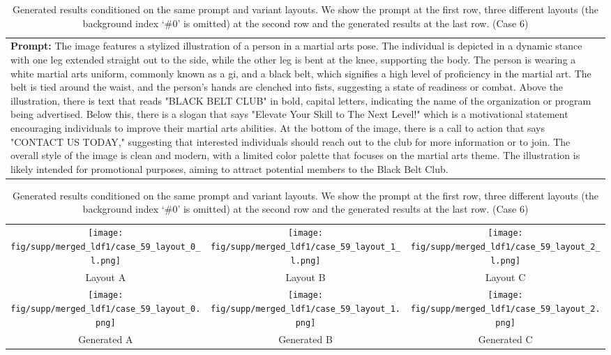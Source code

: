 \begin{table}[htbp]
    \centering
    \begin{tabular}{p{\textwidth}}
    \midrule
    \textbf{Prompt:} \small{The image features a stylized illustration of a person in a martial arts pose. The individual is depicted in a dynamic stance with one leg extended straight out to the side, while the other leg is bent at the knee, supporting the body. The person is wearing a white martial arts uniform, commonly known as a gi, and a black belt, which signifies a high level of proficiency in the martial art. The belt is tied around the waist, and the person's hands are clenched into fists, suggesting a state of readiness or combat. Above the illustration, there is text that reads "BLACK BELT CLUB" in bold, capital letters, indicating the name of the organization or program being advertised. Below this, there is a slogan that says "Elevate Your Skill to The Next Level!" which is a motivational statement encouraging individuals to improve their martial arts abilities. At the bottom of the image, there is a call to action that says "CONTACT US TODAY," suggesting that interested individuals should reach out to the club for more information or to join. The overall style of the image is clean and modern, with a limited color palette that focuses on the martial arts theme. The illustration is likely intended for promotional purposes, aiming to attract potential members to the Black Belt Club.}
    \vspace{1em}
    \end{tabular}
    \begin{tabular}{ccc}
        \texttt{[image: fig/supp/merged\_ldf1/case\_59\_layout\_0\_l.png]} &
        \texttt{[image: fig/supp/merged\_ldf1/case\_59\_layout\_1\_l.png]} &
        \texttt{[image: fig/supp/merged\_ldf1/case\_59\_layout\_2\_l.png]} \\
        \small{Layout A} & \small{Layout B} & \small{Layout C} \\[1em]
        \texttt{[image: fig/supp/merged\_ldf1/case\_59\_layout\_0.png]} &
        \texttt{[image: fig/supp/merged\_ldf1/case\_59\_layout\_1.png]} &
        \texttt{[image: fig/supp/merged\_ldf1/case\_59\_layout\_2.png]} \\
        \small{Generated A} & \small{Generated B} & \small{Generated C} \\
        \bottomrule
    \end{tabular}
    
    \caption{Generated results conditioned on the same prompt and variant layouts. We show the prompt at the first row, three different layouts (the background index `\#0' is omitted) at the second row and the generated results at the last row. (Case 6)}
    \label{tab:variant_layout6}
\end{table}

